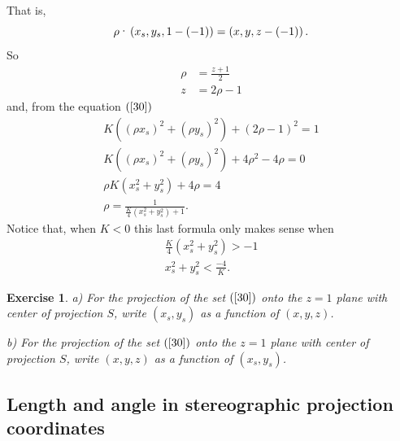 \documentclass{article}%
\newtheorem{exercise}[theorem]{Exercise}
\begin{document}
That is,%
\[
\rho\text{\textperiodcentered}\left(  x_{s},y_{s},1-\left(  -1\right)
\right)  =\left(  x,y,z-\left(  -1\right)  \right)  .
\]
So%
\begin{align*}
\rho &  =\frac{z+1}{2}\\
z  &  =2\rho-1
\end{align*}
and, from the equation $\left(  \ref{30}\right)  $%
\begin{gather*}
K\left(  \left(  \rho x_{s}\right)  ^{2}+\left(  \rho y_{s}\right)
^{2}\right)  +\left(  2\rho-1\right)  ^{2}=1\\
K\left(  \left(  \rho x_{s}\right)  ^{2}+\left(  \rho y_{s}\right)
^{2}\right)  +4\rho^{2}-4\rho=0\\
\rho K\left(  x_{s}^{2}+y_{s}^{2}\right)  +4\rho=4\\
\rho=\frac{1}{\frac{K}{4}\left(  x_{s}^{2}+y_{s}^{2}\right)  +1}.
\end{gather*}
Notice that, when $K<0$ this last formula only makes sense when%
\begin{gather*}
\frac{K}{4}\left(  x_{s}^{2}+y_{s}^{2}\right)  >-1\\
x_{s}^{2}+y_{s}^{2}<\frac{-4}{K}.
\end{gather*}


\begin{exercise}
\label{35}a) For the projection of the set $\left(  \ref{30}\right)  $ onto
the $z=1$ plane with center of projection $S$, write $\left(  x_{s}%
,y_{s}\right)  $ as a function of $\left(  x,y,z\right)  $.

b) For the projection of the set $\left(  \ref{30}\right)  $ onto the $z=1$
plane with center of projection $S$, write $\left(  x,y,z\right)  $ as a
function of $\left(  x_{s},y_{s}\right)  $.\pagebreak
\end{exercise}

\subsection{Length and angle in stereographic projection coordinates}
\end{document}
